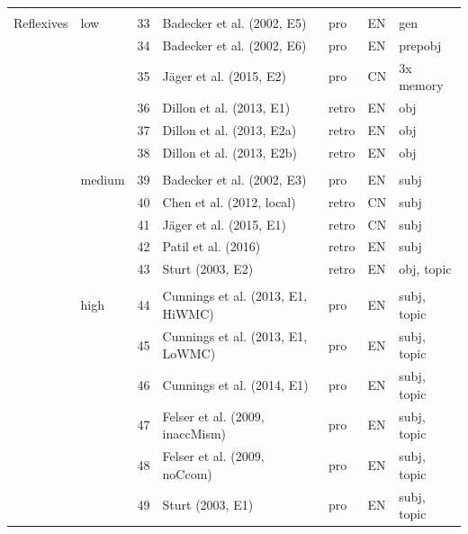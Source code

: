 \documentclass{cambridge7A}\usepackage[]{graphicx}\usepackage[]{color}
\begin{document}
\begin{subappendices}
\begin{table}[ht]
{\begin{tabular}{llrllll}
&&&&&& \\
Reflexives     & low      & 33    & Badecker et al. (2002, E5)          & pro     & EN   & gen \\
               &            & 34    & Badecker et al. (2002, E6)          & pro     & EN   & prepobj \\
               &            & 35    & J\"ager et al. (2015, E2)            & pro     & CN   & 3x memory \\
               &            & 36    & Dillon et al. (2013, E1)            & retro   & EN   & obj \\
               &            & 37    & Dillon et al. (2013, E2a)            & retro   & EN   & obj \\
               &            & 38    & Dillon et al. (2013, E2b)            & retro   & EN   & obj \\
&&&&&& \\
               & medium         & 39    & Badecker et al. (2002, E3)          & pro     & EN   & subj \\
               &            & 40    & Chen et al. (2012, local)           & retro   & CN   & subj \\
               &            & 41    & J\"ager et al. (2015, E1)            & retro   & CN   & subj \\
               &            & 42    & Patil et al. (2016)                 & retro   & EN   & subj \\
               &            & 43    & Sturt (2003, E2)                    & retro   & EN   & obj, topic \\
&&&&&& \\
               & high        & 44    & Cunnings et al. (2013, E1, HiWMC)   & pro     & EN   & subj, topic \\
               &            & 45    & Cunnings et al. (2013, E1, LoWMC)   & pro     & EN   & subj, topic \\
               &            & 46    & Cunnings et al. (2014, E1)          & pro     & EN   & subj, topic \\
               &            & 47    & Felser et al. (2009, inaccMism)     & pro     & EN   & subj, topic \\
               &            & 48    & Felser et al. (2009, noCcom)        & pro     & EN   & subj, topic \\
               &            & 49    & Sturt (2003, E1)                    & pro     & EN   & subj, topic \\

\end{tabular}}
\end{table}
\end{subappendices}
\end{document}

